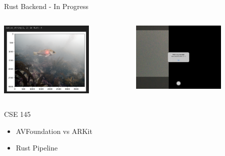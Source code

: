 \begin{frame}{Rust Backend - In Progress}
    \begin{columns}
        \begin{column}{0.5\textwidth}
            \includegraphics[height=0.7\textheight,width=0.7\textwidth,keepaspectratio]{images/fs_cli_rust.png}
        \end{column}
        \begin{column}{0.5\textwidth}
            \includegraphics[height=0.7\textheight,width=0.7\textwidth,keepaspectratio]{images/fs_ipad_rust.png}
        \end{column}
    \end{columns}
\end{frame}

\begin{frame}{CSE 145}
    \begin{itemize}
        \item AVFoundation vs ARKit
        \item Rust Pipeline
    \end{itemize}
\end{frame}

